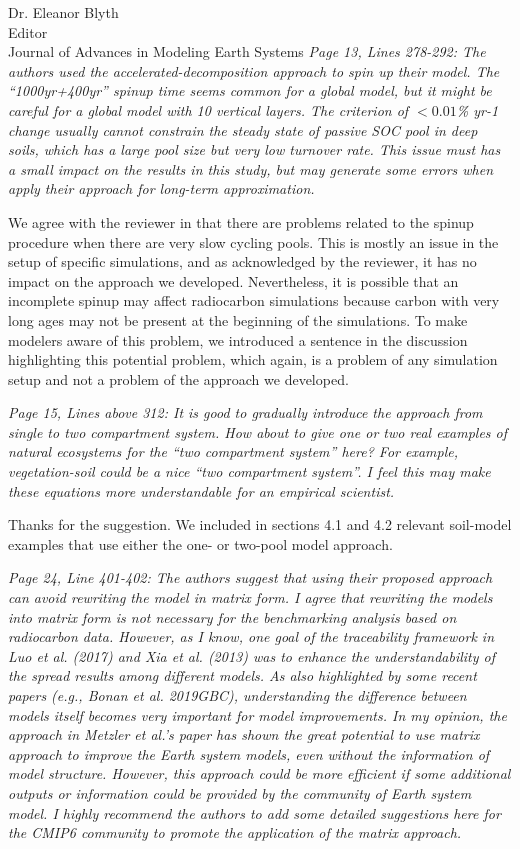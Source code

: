 \documentclass[11pt]{bgcletter}
\begin{document}
\begin{letter}{Dr. Eleanor Blyth\\
 Editor \\ Journal of Advances in Modeling Earth Systems}
{\it Page 13, Lines 278-292: The authors used the accelerated-decomposition approach to spin up their model. The ``1000yr+400yr'' spinup time seems common for a global model, but it might be careful for a global model with 10 vertical layers. The criterion of $<0.01$\% yr-1 change usually cannot constrain the steady state of passive SOC pool in deep soils, which has a large pool size but very low turnover rate. This issue must has a small impact on the results in this study, but may generate some errors when apply their approach for long-term approximation. }

{\color{blue} We agree with the reviewer in that there are problems related to the spinup procedure when there are very slow cycling pools. This is mostly an issue in the setup of specific simulations, and as acknowledged by the reviewer, it has no impact on the approach we developed. Nevertheless, it is possible that an incomplete spinup may affect radiocarbon simulations because carbon with very long ages may not be present at the beginning of the simulations. To make modelers aware of this problem, we introduced a sentence in the discussion highlighting this potential problem, which again, is a problem of any simulation setup and not a problem of the approach we developed.}

{\it Page 15, Lines above 312: It is good to gradually introduce the approach from single to two compartment system. How about to give one or two real examples of natural ecosystems for the ``two compartment system'' here? For example, vegetation-soil could be a nice ``two compartment system''. I feel this may make these equations more understandable for an empirical scientist.}

{\color{blue} Thanks for the suggestion. We included in sections 4.1 and 4.2 relevant soil-model examples that use either the one- or two-pool model approach.}

{\it Page 24, Line 401-402: The authors suggest that using their proposed approach can avoid rewriting the model in matrix form. I agree that rewriting the models into matrix form is not necessary for the benchmarking analysis based on radiocarbon data. However, as I know, one goal of the traceability framework in Luo et al. (2017) and Xia et al. (2013) was to enhance the understandability of the spread results among different models. As also highlighted by some recent papers (e.g., Bonan et al. 2019GBC), understanding the difference between models itself becomes very important for model improvements. In my opinion, the approach in Metzler et al.'s paper has shown the great potential to use matrix approach to improve the Earth system models, even without the information of model structure. However, this approach could be more efficient if some additional outputs or information could be provided by the community of Earth system model. I highly recommend the authors to add some detailed suggestions here for the CMIP6 community to promote the application of the matrix approach. }


\end{letter}
\end{document}
